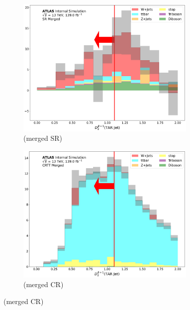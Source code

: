 \begin{figure}[htbp]
   \begin{subfigure}{0.45\textwidth}
     \includegraphics[width = 0.95\textwidth]{Figures/App_SR_CR_distributions/SR1L_Merged/TARJets10_TAR_D20_N_1.pdf}
    \caption{\DtwoTAR (merged SR)}
     \end{subfigure}
    \begin{subfigure}{0.45\textwidth}
     \includegraphics[width = 0.95\textwidth]{Figures/App_SR_CR_distributions/CRTT_Merged/TARJets10_TAR_D20_N_1.pdf}
     \caption{\DtwoTAR (merged \ttbar CR)}
     \end{subfigure}


\end{figure}
